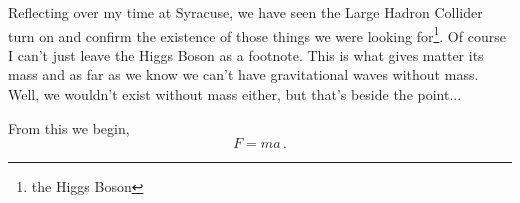 Reflecting over my time at Syracuse, we have seen the Large Hadron Collider
turn on and confirm the existence of those things we were looking
for\footnote{the Higgs Boson}.
Of course I can't just leave the Higgs Boson as a footnote.
This is what gives matter its mass and as far as we know we can't have
gravitational waves without mass.
Well, we wouldn't exist without mass either, but that's beside the point...





From this we begin,
\begin{equation}
F = ma\,.
\end{equation}
